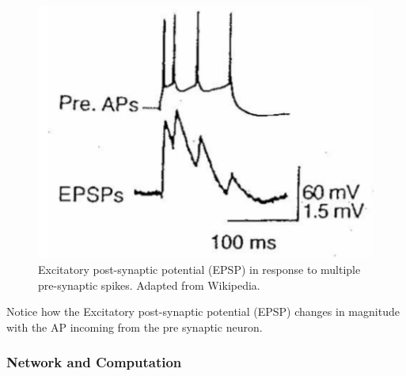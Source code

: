 \begin{figure}
    \centering
    \includegraphics[width=0.5\linewidth]{Figures/Synapse_EPSP.PNG}
    \caption{Excitatory post-synaptic potential (EPSP) in response to multiple pre-synaptic spikes. Adapted from Wikipedia.}
    \label{fig:Synapse_EPSP}
\end{figure}

Notice how the Excitatory post-synaptic potential (EPSP) changes in magnitude with the AP incoming from the pre synaptic neuron. 







\subsubsection{Network and Computation}

